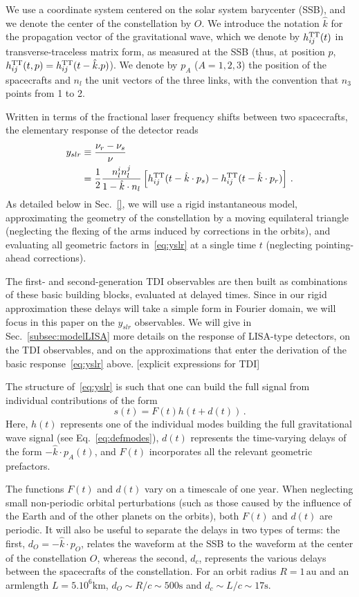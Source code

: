 \documentclass[aps,showpacs,twocolumn,
prd,superscriptaddress,nofootinbib]{revtex4-1}
\newcommand{\be}{\begin{equation}}
\newcommand{\ee}{\end{equation}}
\newcommand{\nn}{\nonumber}
\newcommand{\SM}[1]{{\color{Red} #1}}
\begin{document}
We use a coordinate system centered on the solar system barycenter (SSB), and we denote the center of the constellation by $O$. We introduce the notation $\hat{k}$ for the propagation vector of the gravitational wave, which we denote by $h_{ij}^{\rm TT}(t)$ in transverse-traceless matrix form, as measured at the SSB (thus, at position $p$, $h_{ij}^{\rm TT}(t, p) = h_{ij}^{\rm TT}(t - \hat{k}.p)$). We denote by $p_{A}$ ($A=1,2,3$) the position of the spacecrafts and $n_{l}$ the unit vectors of the three links, with the convention that $n_{3}$ points from 1 to 2.

Written in terms of the fractional laser frequency shifts between two spacecrafts, the elementary response of the detector reads~\cite{EW75, RCP04, Vallisneri04}
\begin{align}\label{eq:yslr}
	y_{slr} &\equiv \frac{\nu_{r} - \nu_{s}}{\nu} \nn\\
	&= \frac{1}{2} \frac{n_{l}^{i}n_{l}^{j}}{1 - \hat{k}\cdot n_{l}} \left[ h_{ij}^{\rm TT}(t - \hat{k}\cdot p_{s}) - h_{ij}^{\rm TT}(t - \hat{k}\cdot p_{r}) \right] \,.
\end{align}
As detailed below in Sec.~\ref{}, we will use a rigid instantaneous model, approximating the geometry of the constellation by a moving equilateral triangle (neglecting the flexing of the arms induced by corrections in the orbits), and evaluating all geometric factors in~\eqref{eq:yslr} at a single time $t$ (neglecting pointing-ahead corrections).

The first- and second-generation TDI observables are then built as combinations of these basic building blocks, evaluated at delayed times. Since in our rigid approximation these delays will take a simple form in Fourier domain, we will focus in this paper on the $y_{slr}$ observables. We will give in Sec.~\ref{subsec:modelLISA} more details on the response of LISA-type detectors, on the TDI observables, and on the approximations that enter the derivation of the basic response~\eqref{eq:yslr} above. \SM{[explicit expressions for TDI]}

The structure of~\eqref{eq:yslr} is such that one can build the full signal from individual contributions of the form
\be
	s(t) = F(t) h(t + d(t)) \,.
\ee
Here, $h(t)$ represents one of the individual modes building the full gravitational wave signal (see Eq.~\eqref{eq:defmodes}), $d(t)$ represents the time-varying delays of the form $-\hat{k}\cdot p_{A}(t)$, and $F(t)$ incorporates all the relevant geometric prefactors.

The functions $F(t)$ and $d(t)$ vary on a timescale of one year. When neglecting small non-periodic orbital perturbations (such as those caused by the influence of the Earth and of the other planets on the orbits), both $F(t)$ and $d(t)$ are periodic. It will also be useful to separate the delays in two types of terms: the first, $d_{O} = -\hat{k}\cdot p_{O}$, relates the waveform at the SSB to the waveform at the center of the constellation $O$, whereas the second, $d_{c}$, represents the various delays between the spacecrafts of the constellation. For an orbit radius $R=1\,\mathrm{au}$ and an armlength $L=5.10^{6}\mathrm{km}$, $d_{O} \sim R/c \sim 500\mathrm{s}$ and $d_{c} \sim L/c \sim 17\mathrm{s}$.
\end{document}
